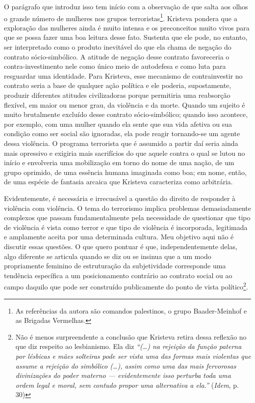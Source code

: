 O parágrafo que introduz isso tem início com a observação de que salta
aos olhos o grande número de mulheres nos grupos terroristas\footnote{As
  referências da autora são comandos palestinos, o grupo Baader-Meinhof
  e as Brigadas Vermelhas.}. Kristeva pondera que a exploração das
mulheres ainda é muito intensa e os preconceitos muito vivos para que se
possa fazer uma boa leitura desse fato. Sustenta que ele pode, no
entanto, ser interpretado como o produto inevitável do que ela chama de
negação do contrato sócio-simbólico. A atitude de negação desse contrato
favoreceria o contra-investimento nele como único meio de autodefesa e
como luta para resguardar uma identidade. Para Kristeva, esse mecanismo
de contrainvestir no contrato seria a base de qualquer ação política e
ele poderia, supostamente, produzir diferentes atitudes civilizadoras
porque permitiria uma reabsorção flexível, em maior ou menor grau, da
violência e da morte. Quando um sujeito é muito brutalmente excluído
desse contrato sócio-simbólico; quando isso acontece, por exemplo, com
uma mulher quando ela sente que sua vida afetiva ou sua condição como
ser social são ignoradas, ela pode reagir tornando-se um agente dessa
violência. O programa terrorista que é assumido a partir daí seria ainda
mais opressivo e exigiria mais sacrifícios do que aquele contra o qual
se lutou no início e envolveria uma mobilização em torno do nome de uma
nação, de um grupo oprimido, de uma essência humana imaginada como boa;
em nome, então, de uma espécie de fantasia arcaica que Kristeva
caracteriza como arbitrária.

Evidentemente, é necessária e irrecusável a questão do direito de
responder à violência com violência. O tema do terrorismo implica
problemas demasiadamente complexos que passam fundamentalmente pela
necessidade de questionar que tipo de violência é vista como terror e
que tipo de violência é incorporada, legitimada e amplamente aceita por
uma determinada cultura. Meu objetivo aqui não é discutir essas
questões. O que quero pontuar é que, independentemente delas, algo
diferente se articula quando se diz ou se insinua que a um modo
propriamente feminino de estruturação da subjetividade corresponde uma
tendência específica a um posicionamento contrário ao contrato social ou
ao campo daquilo que pode ser construído publicamente do ponto de vista
político\footnote{Não é menos surpreendente a conclusão que Kristeva
  retira dessa reflexão no que diz respeito ao lesbianismo. Ela diz
  \emph{``(\ldots{}) na rejeição da função paterna por lésbicas e mães
      solteiras pode ser vista uma das formas mais violentas que assume a
      rejeição do simbólico (\ldots{}), assim como uma das mais fervorosas
      divinizações do poder materno --- evidentemente isso perturba toda uma
      ordem legal e moral, sem contudo propor uma alternativa a ela.''}
  (\emph{Idem}, p. 30)}.

